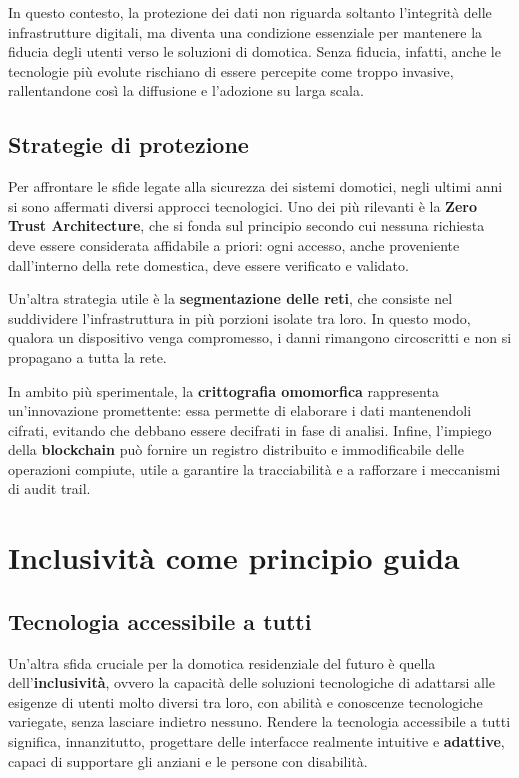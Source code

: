In questo contesto, la protezione dei dati non riguarda soltanto l’integrità delle infrastrutture digitali, ma diventa una condizione essenziale per mantenere la fiducia degli utenti verso le soluzioni di domotica. Senza fiducia, infatti, anche le tecnologie più evolute rischiano di essere percepite come troppo invasive, rallentandone così la diffusione e l’adozione su larga scala.



\subsection{Strategie di protezione}

Per affrontare le sfide legate alla sicurezza dei sistemi domotici, negli ultimi anni si sono affermati diversi approcci tecnologici. Uno dei più rilevanti è la \textbf{Zero Trust Architecture}, che si fonda sul principio secondo cui nessuna richiesta deve essere considerata affidabile a priori: ogni accesso, anche proveniente dall’interno della rete domestica, deve essere verificato e validato.  

Un’altra strategia utile è la \textbf{segmentazione delle reti}, che consiste nel suddividere l’infrastruttura in più porzioni isolate tra loro. In questo modo, qualora un dispositivo venga compromesso, i danni rimangono circoscritti e non si propagano a tutta la rete.  

In ambito più sperimentale, la \textbf{crittografia omomorfica} rappresenta un’innovazione promettente: essa permette di elaborare i dati mantenendoli cifrati, evitando che debbano essere decifrati in fase di analisi. Infine, l’impiego della \textbf{blockchain} può fornire un registro distribuito e immodificabile delle operazioni compiute, utile a garantire la tracciabilità e a rafforzare i meccanismi di audit trail.

\section{Inclusività come principio guida}

\subsection{Tecnologia accessibile a tutti}

Un’altra sfida cruciale per la domotica residenziale del futuro è quella dell’\textbf{inclusività}, ovvero la capacità delle soluzioni tecnologiche di adattarsi alle esigenze di utenti molto diversi tra loro, con abilità e conoscenze tecnologiche variegate, senza lasciare indietro nessuno. Rendere la tecnologia accessibile a tutti significa, innanzitutto, progettare delle interfacce realmente intuitive e \textbf{adattive}, capaci di supportare gli anziani e le persone con disabilità.  

